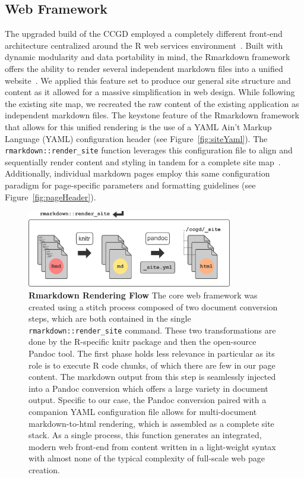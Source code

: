 \documentclass[10pt]{report}
\begin{document}
\subsection{Web Framework}
The upgraded build of the CCGD employed a completely different front-end architecture centralized around the R web services environment~\cite{rstudioteamRStudioIntegratedDevelopment2020}. Built with dynamic modularity and data portability in mind, the Rmarkdown framework offers the ability to render several independent markdown files into a unified website~\cite{xieMarkdownDefinitiveGuide}. We applied this feature set to produce our general site structure and content as it allowed for a massive simplification in web design. While following the existing site map, we recreated the raw content of the existing application as independent markdown files. The keystone feature of the Rmarkdown framework that allows for this unified rendering is the use of a YAML Ain't Markup Language (YAML) configuration header (see Figure~\ref{fig:siteYaml}). The \texttt{rmarkdown::render\_site} function leverages this configuration file to align and sequentially render content and styling in tandem for a complete site map~\cite{xieMarkdownDefinitiveGuide}. Additionally, individual markdown pages employ this same configuration paradigm for page-specific parameters and formatting guidelines (see Figure~\ref{fig:pageHeader}).

\begin{figure}[H]
    \center{}
    \includegraphics[width=0.8\textwidth]{fig/rmarkdown_flow.pdf}
    \caption[Rmarkdown Rendering Flow]{\textbf{Rmarkdown Rendering Flow} The core web framework was created using a stitch process composed of two document conversion steps, which are both contained in the single \texttt{rmarkdown::render\_site} command. These two transformations are done by the R-specific knitr package and then the open-source Pandoc tool. The first phase holds less relevance in particular as its role is to execute R code chunks, of which there are few in our page content. The markdown output from this step is seamlessly injected into a Pandoc conversion which offers a large variety in document output. Specific to our case, the Pandoc conversion paired with a companion YAML configuration file allows for multi-document markdown-to-html rendering, which is assembled as a complete site stack. As a single process, this function generates an integrated, modern web front-end from content written in a light-weight syntax with almost none of the typical complexity of full-scale web page creation.}\label{fig:renderFlow}
\end{figure}
\end{document}
